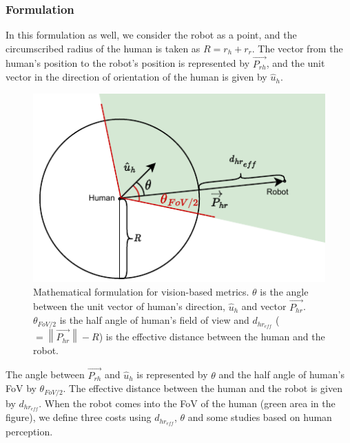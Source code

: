\subsubsection{Formulation}
In this formulation as well, we consider the robot as a point, and the circumscribed radius of the human is taken as $R=r_h+r_r$. The vector from the human's position to the robot's position is represented by $\overrightarrow{P_{rh}}$, and the unit vector in the direction of orientation of the human is given by $\hat{u}_h$.
\begin{figure}[!h]
    \centering
    \includegraphics[width=0.8\columnwidth]{images/chapter6/fig_vision_2.pdf}
    \caption{Mathematical formulation for vision-based metrics. $\theta$ is the angle between the unit vector of human's direction, $\hat{u}_h$ and vector $\overrightarrow{P_{hr}}$. $\theta_{FoV/2}$ is the half angle of human's field of view and $d_{hr_{eff}}$ ($= \left\lVert \overrightarrow{P_{hr}} \right\rVert - R$) is the effective distance between the human and the robot.}
    \label{fig:vision_vectors}
\end{figure}
The angle between $\overrightarrow{P_{rh}}$ and $\hat{u}_h$ is represented by $\theta$ and the half angle of human's FoV by $\theta_{FoV/2}$. The effective distance between the human and the robot is given by $d_{hr_{eff}}$. When the robot comes into the FoV of the human (green area in the figure), we define three costs using $d_{hr_{eff}}$, $\theta$ and some studies based on human perception.
